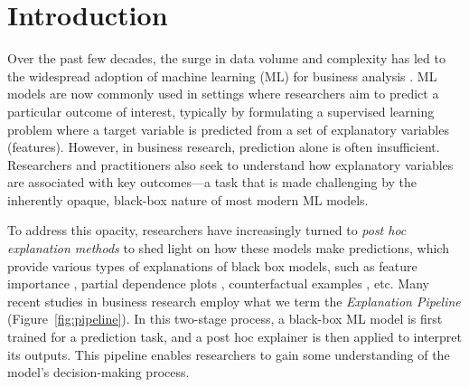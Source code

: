 \documentclass[mnsc,blindrev]{informs3}
\begin{document}
\section{Introduction}

Over the past few decades, the surge in data volume and complexity has led to the widespread adoption of machine learning (ML) for business analysis \citep{kleinberg2015prediction,mullainathan17applied}. ML models are now commonly used in settings where researchers aim to predict a particular outcome of interest, typically by formulating a supervised learning problem where a target variable is predicted from a set of explanatory variables (features).  However, in business research, prediction alone is often insufficient. Researchers and practitioners also seek to understand how explanatory variables are associated with key outcomes—a task that is made challenging by the inherently opaque, black-box nature of most modern ML models.

To address this opacity, researchers have increasingly turned to \emph{post hoc explanation methods} to shed light on how these models make predictions, which provide various types of explanations of black box models, such as feature importance \citep{ribeiro16lime,lundberg17shap}, partial dependence plots \citep{friedman01pdp}, counterfactual examples \citep{mothilal20dice}, etc. Many recent studies in business research employ what we term the \emph{Explanation Pipeline} (Figure~\ref{fig:pipeline}). In this two-stage process, a black-box ML model is first trained for a prediction task, and a post hoc explainer is then applied to interpret its outputs. This pipeline enables researchers to gain some understanding of the model's decision-making process.
\end{document}
